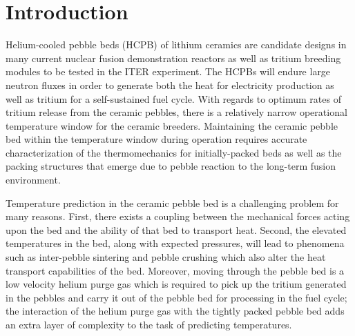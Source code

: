 \chapter{Introduction} \label{sec:introduction}
Helium-cooled pebble beds (HCPB) of lithium ceramics are candidate designs in many current nuclear fusion demonstration reactors as well as tritium breeding modules to be tested in the ITER experiment. The HCPBs will endure large neutron fluxes in order to generate both the heat for electricity production as well as tritium for a self-sustained fuel cycle. With regards to optimum rates of tritium release from the ceramic pebbles, there is a relatively narrow operational temperature window for the ceramic breeders. Maintaining the ceramic pebble bed within the temperature window during operation requires accurate characterization of the thermomechanics for initially-packed beds as well as the packing structures that emerge due to pebble reaction to the long-term fusion environment.

Temperature prediction in the ceramic pebble bed is a challenging problem for many reasons. First, there exists a coupling between the mechanical forces acting upon the bed and the ability of that bed to transport heat. Second, the elevated temperatures in the bed, along with expected pressures, will lead to phenomena such as inter-pebble sintering and pebble crushing which also alter the heat transport capabilities of the bed. Moreover, moving through the pebble bed is a low velocity helium purge gas which is required to pick up the tritium generated in the pebbles and carry it out of the pebble bed for processing in the fuel cycle; the interaction of the helium purge gas with the tightly packed pebble bed adds an extra layer of complexity to the task of predicting temperatures. 

